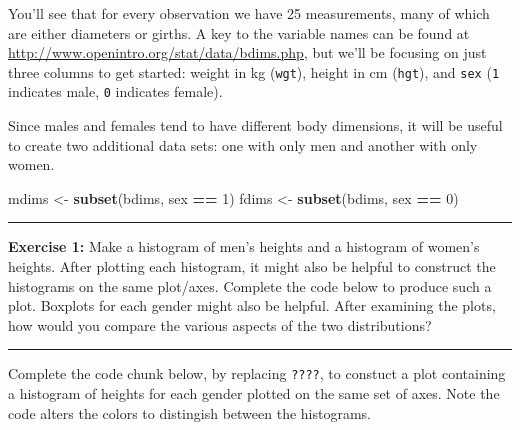 \documentclass[]{book}
\newenvironment{Shaded}{\begin{snugshade}}{\end{snugshade}}
\newcommand{\KeywordTok}[1]{\textcolor[rgb]{0.13,0.29,0.53}{\textbf{#1}}}
\newcommand{\DecValTok}[1]{\textcolor[rgb]{0.00,0.00,0.81}{#1}}
\newcommand{\StringTok}[1]{\textcolor[rgb]{0.31,0.60,0.02}{#1}}
\newcommand{\OperatorTok}[1]{\textcolor[rgb]{0.81,0.36,0.00}{\textbf{#1}}}
\newcommand{\NormalTok}[1]{#1}
\theoremstyle{definition}
\theoremstyle{definition}
\theoremstyle{definition}
\theoremstyle{remark}
\begin{document}
You'll see that for every observation we have 25 measurements, many of
which are either diameters or girths. A key to the variable names can be
found at \url{http://www.openintro.org/stat/data/bdims.php}, but we'll
be focusing on just three columns to get started: weight in kg
(\texttt{wgt}), height in cm (\texttt{hgt}), and \texttt{sex}
(\texttt{1} indicates male, \texttt{0} indicates female).

Since males and females tend to have different body dimensions, it will
be useful to create two additional data sets: one with only men and
another with only women.

\begin{Shaded}
\begin{Highlighting}[]
\NormalTok{mdims <-}\StringTok{ }\KeywordTok{subset}\NormalTok{(bdims, sex }\OperatorTok{==}\StringTok{ }\DecValTok{1}\NormalTok{)}
\NormalTok{fdims <-}\StringTok{ }\KeywordTok{subset}\NormalTok{(bdims, sex }\OperatorTok{==}\StringTok{ }\DecValTok{0}\NormalTok{)}
\end{Highlighting}
\end{Shaded}

\begin{center}\rule{0.5\linewidth}{\linethickness}\end{center}

\textbf{Exercise 1:} Make a histogram of men's heights and a histogram
of women's heights. After plotting each histogram, it might also be
helpful to construct the histograms on the same plot/axes. Complete the
code below to produce such a plot. Boxplots for each gender might also
be helpful. After examining the plots, how would you compare the various
aspects of the two distributions?

\begin{center}\rule{0.5\linewidth}{\linethickness}\end{center}

Complete the code chunk below, by replacing \texttt{????}, to constuct a
plot containing a histogram of heights for each gender plotted on the
same set of axes. Note the code alters the colors to distingish between
the histograms.
\end{document}

